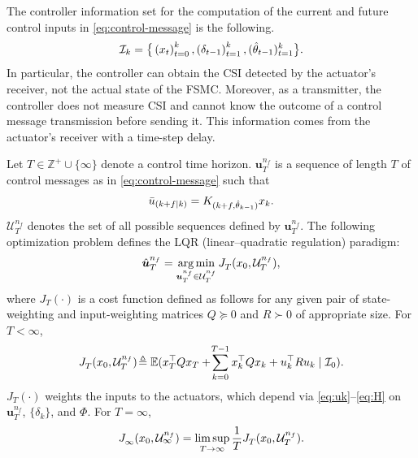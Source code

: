 \documentclass[letterpaper, 10 pt, conference]{ieeeconf}  %
\begin{document}
The controller information set for the computation of the current and future control inputs in \eqref{eq:control-message} is the following.
	\begin{equation}\label{eq:info-set}
\text{\small $\mathcal{I}_{k} = \big\{
	\left(x_{t}\right)_{t=0}^{k}, 
	\left(\delta_{t-1}\right)_{t=1}^{k}, 
	(\hat{\theta}_{t-1})_{t=1}^{k} \big\}$}.
\end{equation}
In particular, the controller can obtain the CSI detected by the actuator's receiver, not the actual state of the FSMC. Moreover, as a transmitter, the controller does not measure CSI and cannot know the outcome of a control message transmission before sending it. This information comes from the actuator's receiver with a time-step delay.

Let $T\in\mathbb{Z}^{+} \cup \{\infty\}$ denote a control time horizon. $\bm{u}_{T}^{n_f}$ is a sequence of length $T$ of control messages as in \eqref{eq:control-message} such that
\begin{equation}\label{eq:control-element}
    \text{\small $\bar{u}_{(k+f\mid k)} = K_{(k+f,\hat{\theta}_{k-1})}x_k$}.
\end{equation}
$\mathcal{U}_{T}^{n_f}$ denotes the set of all possible sequences defined by $\bm{u}_{T}^{n_f}$.
The following optimization problem defines
the LQR (linear--quadratic regulation) paradigm:
\begin{equation}\label{eq:control-fin}
    \text{\small $\hat{\bm{u}}_{T}^{n_f} = \mathop{\mathrm{arg\,min}}_{\bm{u}_{T}^{n_f} \in \mathcal{U}_{T}^{n_f}} J_{T}^{}(x_0,\mathcal{U}_{T}^{n_f})$},
\end{equation}
where $J_{T}^{}(\cdot)$ is a cost function defined as follows for any given pair of state-weighting and input-weighting matrices $Q\succeq 0$ and $R \succ 0$ of appropriate size.
For $T<\infty$,
\begin{equation}\label{eq:cost-def-fin}
    \text{\small $J_{T}^{}(x_0,\mathcal{U}_{T}^{n_f}) \!\triangleq \mathbb{E}(x_T^{\top} Q x_T +\! \sum_{k=0}^{T-1} x_k^{\top} Q x_k + u_k^{\top}Ru_k \mid \mathcal{I}_0)$}.
\end{equation}
$J_{T}^{}(\cdot)$ weights the inputs to the actuators, which depend via \eqref{eq:uk}--\eqref{eq:H} on $\bm{u}_{T}^{n_f}$, $\{\delta_k\}$, and $\mathit{\Phi}$. For $T=\infty$, 
\begin{equation}\label{eq:cost-def-inf}
    \text{\small $J_{\infty}^{}(x_0,\mathcal{U}_{\infty}^{n_f}) = \limsup_{T\to\infty} \frac{1}{T} J_{T}^{}(x_0,\mathcal{U}_{T}^{n_f})$}.
\end{equation}
\end{document}
